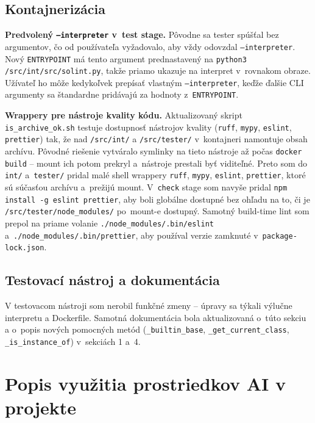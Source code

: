 \documentclass[a4paper, 11pt]{article}
\begin{document}
\subsection*{Kontajnerizácia}

\textbf{Predvolený \texttt{--interpreter} v~test stage.} Pôvodne sa
tester spúšťal bez argumentov, čo od používateľa vyžadovalo, aby
vždy odovzdal \texttt{--interpreter}. Nový \texttt{ENTRYPOINT} má
tento argument prednastavený na \texttt{python3 /src/int/src/solint.py},
takže priamo ukazuje na interpret v~rovnakom obraze. Užívateľ ho môže
kedykoľvek prepísať vlastným \texttt{--interpreter}, keďže ďalšie CLI
argumenty sa štandardne pridávajú za hodnoty z~\texttt{ENTRYPOINT}.

\textbf{Wrappery pre nástroje kvality kódu.} Aktualizovaný skript
\texttt{is\_archive\_ok.sh} testuje dostupnosť nástrojov kvality
(\texttt{ruff}, \texttt{mypy}, \texttt{eslint}, \texttt{prettier})
tak, že nad \texttt{/src/int/} a \texttt{/src/tester/} v~kontajneri
namontuje obsah archívu. Pôvodné riešenie vytváralo symlinky na tieto
nástroje až počas \texttt{docker build} -- mount ich potom prekryl
a~nástroje prestali byť viditeľné. Preto som do \texttt{int/}
a~\texttt{tester/} pridal malé shell wrappery \texttt{ruff}, \texttt{mypy},
\texttt{eslint}, \texttt{prettier}, ktoré sú súčasťou archívu
a~prežijú mount. V~\texttt{check} stage som navyše pridal
\texttt{npm install -g eslint prettier}, aby boli globálne dostupné
bez ohľadu na to, či je \texttt{/src/tester/node\_modules/}
po~mount-e dostupný. Samotný build-time lint som prepol na priame
volanie \texttt{./node\_modules/.bin/eslint} a~\texttt{./node\_modules/.bin/prettier},
aby používal verzie zamknuté v~\texttt{package-lock.json}.

\subsection*{Testovací nástroj a dokumentácia}

V testovacom nástroji som nerobil funkčné zmeny -- úpravy sa týkali
výlučne interpretu a Dockerfile. Samotná dokumentácia bola
aktualizovaná o~túto sekciu a o~popis nových pomocných metód
(\texttt{\_builtin\_base}, \texttt{\_get\_current\_class},
\texttt{\_is\_instance\_of}) v~sekciách 1 a~4.

\section{Popis využitia prostriedkov AI v projekte}
\end{document}
